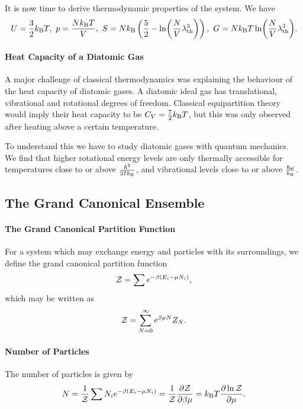 It is now time to derive thermodynamic properties of the system. We have
\begin{align*}
	U = \frac{3}{2}\kb T,\ p = \frac{N\kb T}{V},\ S = N\kb\left(\frac{5}{2} - \ln(\frac{N}{V}\lambda_{\text{th}}^{3})\right),\ G = N\kb T\ln(\frac{N}{V}\lambda_{\text{th}}^{3}).
\end{align*}

\paragraph{Heat Capacity of a Diatomic Gas}
A major challenge of classical thermodynamics was explaining the behaviour of the heat capacity of diatomic gases. A diatomic ideal gas has translational, vibrational and rotational degrees of freedom. Classical equipartition theory would imply their heat capacity to be $C_{V} = \frac{7}{2}k_{\text{B}} T$, but this was only observed after heating above a certain temperature.

To understand this we have to study diatomic gases with quantum mechanics. We find that higher rotational energy levels are only thermally accessible for temperatures close to or above $\frac{\hbar^{2}}{2Ik_{\text{B}}}$, and vibrational levels close to or above $\frac{\hbar\omega}{k_{\text{B}}}$.

\subsection{The Grand Canonical Ensemble}

\paragraph{The Grand Canonical Partition Function}
For a system which may exchange energy and particles with its surroundings, we define the grand canonical partition function
\begin{align*}
	\mathcal{Z} = \sum e^{-\beta(E_{i} - \mu N_{i})},
\end{align*}
which may be written as
\begin{align*}
	\mathcal{Z} = \sum\limits_{N = 0}^{\infty}e^{\beta\mu N}Z_{N}.
\end{align*}

\paragraph{Number of Particles}
The number of particles is given by
\begin{align*}
	N = \frac{1}{\mathcal{Z}}\sum N_{i}e^{-\beta(E_{i} - \mu N_{i})} = \frac{1}{\mathcal{Z}}\pdv{\mathcal{Z}}{\beta\mu} = k_{\text{B}} T\pdv{\ln{\mathcal{Z}}}{\mu}.
\end{align*}

